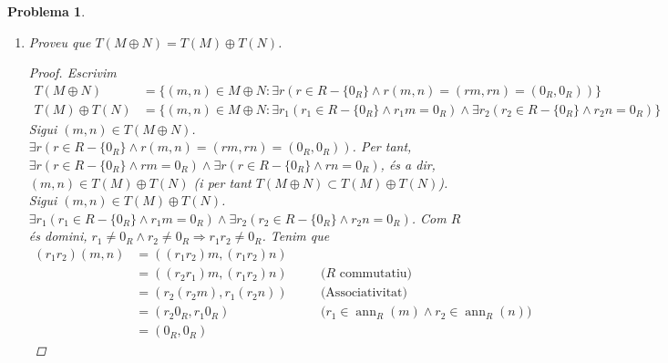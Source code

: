 \documentclass[compress]{article}
\newtheorem{problema}{Problema}
\theoremstyle{definition}
\DeclareMathOperator{\ann}{ann}
\begin{document}
\begin{problema}
\begin{enumerate}
\begin{proof}
\begin{align*}
                &=\{m+T(M):\exists r(r\in R-\{0_{R}\}\land r(m+T(M))=T(M))\}\\
                &=\{m+T(M):\exists r(r\in R-\{0_{R}\}\land rm\in T(M))\}
            \end{align*}
            Sigui $m+T(M)\in T(M/T(M))$. $\exists r(r\in R-\{0_{R}\}\land rm\in T(M))$. Com $rm\in T(M)$, $\exists r'(r'\in R-\{0_{R}\}\land r'(rm)=0_{R})$. Com $R$ és domini i $r,r'\neq0_{R}$, deduïm que $m=0_{R}$. Aleshores, $m+T(M)=0_{R}+T(M)=T(M)\in\{T(M)\}$. Per tant, $T(M/T(M))\subset\{T(M)\}$. Per doble inclusió, $T(M/T(M))=\{T(M)\}$.
        \end{proof}
        \item Proveu que $T(M\oplus N)=T(M)\oplus T(N)$.
        \begin{proof}
            Escrivim
            \begin{align*}
                T(M\oplus N)
                &=\{(m,n)\in M\oplus N:\exists r(r\in R-\{0_{R}\}\land r(m,n)=(rm,rn)=(0_{R},0_{R}))\}\\
                T(M)\oplus T(N)
                &=\{(m,n)\in M\oplus N:\exists r_{1}(r_{1}\in R-\{0_{R}\}\land r_{1}m=0_{R})\land\exists r_{2}(r_{2}\in R-\{0_{R}\}\land r_{2}n=0_{R})\}
            \end{align*}
            Sigui $(m,n)\in T(M\oplus N)$. $\exists r(r\in R-\{0_{R}\}\land r(m,n)=(rm,rn)=(0_{R},0_{R}))$. Per tant, $\exists r(r\in R-\{0_{R}\}\land rm=0_{R})\land\exists r(r\in R-\{0_{R}\}\land rn=0_{R})$, és a dir, $(m,n)\in T(M)\oplus T(N)$ (i per tant $T(M\oplus N)\subset T(M)\oplus T(N)$).\newline
            Sigui $(m,n)\in T(M)\oplus T(N)$. $\exists r_{1}(r_{1}\in R-\{0_{R}\}\land r_{1}m=0_{R})\land\exists r_{2}(r_{2}\in R-\{0_{R}\}\land r_{2}n=0_{R})$. Com $R$ és domini, $r_{1}\neq0_{R}\land r_{2}\neq0_{R}\Rightarrow r_{1}r_{2}\neq0_{R}$. Tenim que
            \begin{align*}
                (r_{1}r_{2})(m,n)
                &=((r_{1}r_{2})m,(r_{1}r_{2})n)\\
                &=((r_{2}r_{1})m,(r_{1}r_{2})n)
                &\quad&\textrm{($R$ commutatiu)}\\
                &=(r_{2}(r_{2}m),r_{1}(r_{2}n))
                &\quad&\textrm{(Associativitat)}\\
                &=(r_{2}0_{R},r_{1}0_{R})
                &\quad&\textrm{($r_{1}\in\ann_{R}(m)\land r_{2}\in\ann_{R}(n)$)}\\
                &=(0_{R},0_{R})

\end{align*}
\end{proof}
\end{enumerate}
\end{problema}
\end{document}
